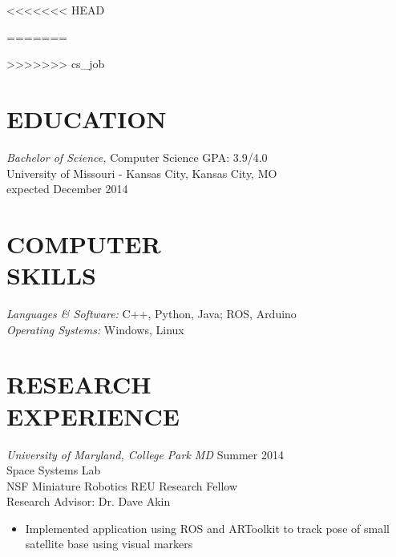 \documentclass[line,margin]{res}
\begin{document}
<<<<<<< HEAD
\address{\hfill (913)235-1070 \textbar \textbar \hspace{1 mm}  victoria.chen.wu@gmail.com \textbar \textbar \hspace{1 mm} vptarmigan.wordpress.com} 
=======
\address{\hfill (913) 235-1070 \textbar \textbar \hspace{1 mm}  victoria.chen.wu@gmail.com \textbar \textbar \hspace{1 mm} vptarmigan.wordpress.com} 
>>>>>>> cs_job

 
\begin{resume}
 
\section{EDUCATION} {\sl Bachelor of Science,} Computer Science	\hfill GPA: 3.9/4.0\\
                University of Missouri - Kansas City, Kansas City, MO \\
                expected December 2014 
\section{COMPUTER \\ SKILLS} {\sl Languages \& Software:} 
		C++, Python, Java; ROS, Arduino \\
                {\sl Operating Systems:} Windows, Linux 
\section {RESEARCH \\ EXPERIENCE}
		{\sl University of Maryland, College Park MD}  \hfill  Summer 2014\\
		Space Systems Lab\\
		NSF Miniature Robotics REU Research Fellow \\
		Research Advisor: Dr. Dave Akin 
                 \begin{itemize}[leftmargin=5mm]  \itemsep -2pt %
		 \item Implemented application using ROS and ARToolkit to track pose of small satellite base using visual markers
         \end{itemize} 
		

\end{resume}
\end{document}
